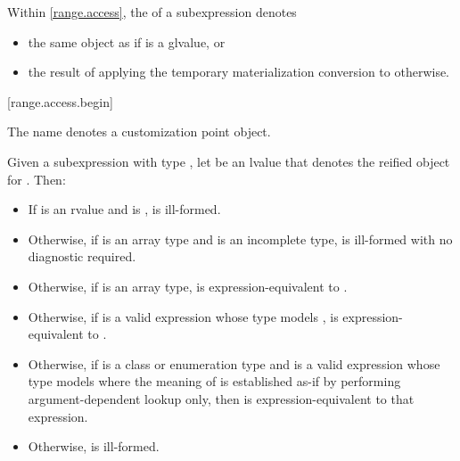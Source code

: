 \pnum
Within \ref{range.access},
the  of a subexpression  denotes
\begin{itemize}
\item
the same object as  if  is a glvalue, or
\item
the result of applying
the temporary materialization conversion to  otherwise.
\end{itemize}

[range.access.begin]{}
%

\pnum
The name  denotes a customization point
object.

\pnum
Given a subexpression  with type ,
let  be an lvalue that denotes the reified object for .
Then:

\begin{itemize}
\item
  If  is an rvalue and
   is ,
   is ill-formed.

\item
  Otherwise, if  is an array type and
   is an incomplete type,
   is ill-formed with no diagnostic required.

\item
  Otherwise, if  is an array type,
   is expression-equivalent to .

\item
  Otherwise, if 
  is a valid expression whose type models
  ,
   is expression-equivalent to
  .

\item
  Otherwise, if  is a class or enumeration type and
  is a valid expression whose type models
  where the meaning of  is established as-if by performing
  argument-dependent lookup only,
  then  is expression-equivalent to
  that expression.

\item
  Otherwise,  is ill-formed.
\end{itemize}

